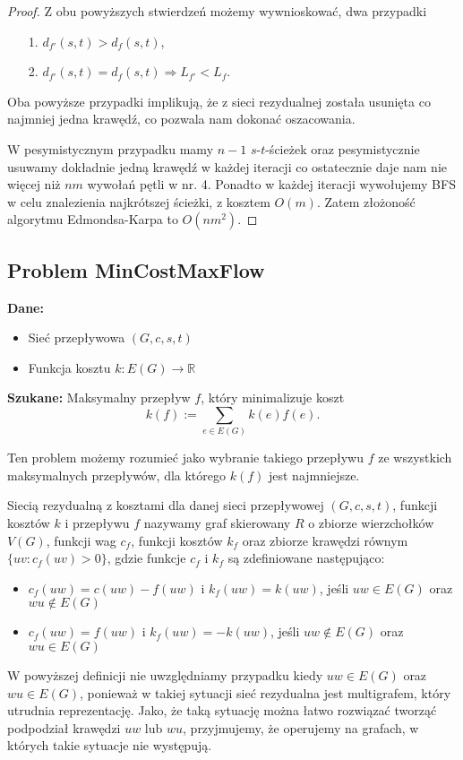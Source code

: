 \begin{theorem}
\begin{proof}
		Z obu powyższych stwierdzeń możemy wywnioskować, dwa przypadki
		\begin{itemize}
			\item[1.] $d_{f'}(s, t) > d_f(s, t)$,
			\item[2.] $d_{f'}(s, t) = d_f(s, t) \Rightarrow 
			L_{f'} < L_f$.
		\end{itemize}
		Oba powyższe przypadki implikują, że z sieci rezydualnej została 
		usunięta co najmniej jedna krawędź, co pozwala nam 
		dokonać oszacowania.
		
		W pesymistycznym przypadku mamy $n-1$ $s$-$t$-ścieżek oraz 
		pesymistycznie usuwamy dokładnie jedną krawędź w każdej iteracji
		co ostatecznie daje nam nie więcej niż $nm$ wywołań pętli w nr. 4.
		Ponadto w każdej iteracji wywołujemy BFS w celu znalezienia najkrótszej
		ścieżki, z kosztem $O(m)$. Zatem złożoność algorytmu Edmondsa-Karpa
		to $O(nm^2)$.
		
	\end{proof}
\end{theorem}

\subsection{Problem MinCostMaxFlow}
\textbf{Dane:}
\begin{itemize}
	\item Sieć przepływowa $(G, c, s, t)$
	\item Funkcja kosztu $k : E(G) \to \mathbb{R}$
\end{itemize}

\textbf{Szukane:}
Maksymalny przepływ $f$, który minimalizuje koszt 
\[k(f) := \sum_{e\in E(G)}k(e)f(e).\]

Ten problem możemy rozumieć jako wybranie takiego przepływu $f$ 
ze wszystkich maksymalnych przepływów, dla którego
$k(f)$ jest najmniejsze. 

\begin{defi}
	Siecią rezydualną z kosztami dla danej sieci przepływowej
	$(G, c, s, t)$, funkcji kosztów $k$ i przepływu $f$ nazywamy
	graf skierowany $R$ o zbiorze wierzchołków $V(G)$, funkcji
	wag $c_f$, funkcji kosztów $k_f$ oraz zbiorze 
	krawędzi równym $\{ uv: c_f(uv) > 0\}$, gdzie funkcje 
	$c_f$ i $k_f$ są zdefiniowane następująco:
	\begin{itemize}
		\item $c_f(uw) = c(uw) - f(uw)$ i $k_f(uw) = k(uw)$,
		jeśli $uw \in E(G)$ oraz $wu \not \in E(G)$
		\item $c_f(uw) = f(uw)$ i $k_f(uw) = -k(uw)$,
		jeśli $uw \not \in E(G)$ oraz $wu \in E(G)$
	\end{itemize} 
\end{defi}
W powyższej definicji nie uwzględniamy przypadku kiedy 
$uw \in E(G)$ oraz $wu \in E(G)$, ponieważ w takiej sytuacji
sieć rezydualna jest multigrafem, który utrudnia reprezentację. 
Jako, że taką sytuację można łatwo rozwiązać tworząć podpodział
krawędzi $uw$ lub $wu$, przyjmujemy, że operujemy na grafach,
w których takie sytuacje nie występują.

